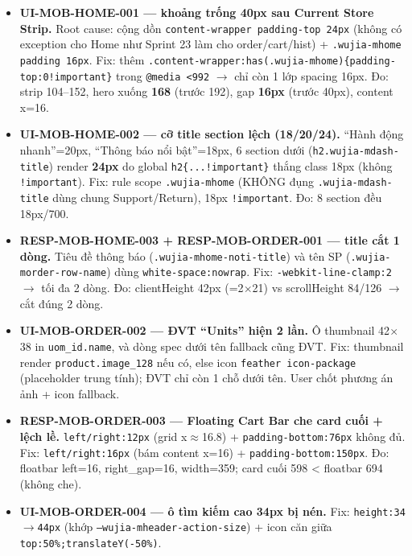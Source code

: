 \begin{itemize}
  \item \textbf{UI-MOB-HOME-001 --- khoảng trống 40px sau Current Store Strip.} Root cause: cộng dồn
    \texttt{content-wrapper padding-top 24px} (không có exception cho Home như Sprint 23 làm cho
    order/cart/hist) + \texttt{.wujia-mhome padding 16px}. Fix: thêm
    \texttt{.content-wrapper:has(.wujia-mhome)\{padding-top:0!important\}} trong \texttt{@media <992}
    $\to$ chỉ còn 1 lớp spacing 16px. Đo: strip 104--152, hero xuống \textbf{168} (trước 192),
    gap \textbf{16px} (trước 40px), content x=16.
  \item \textbf{UI-MOB-HOME-002 --- cỡ title section lệch (18/20/24).} ``Hành động nhanh''=20px,
    ``Thông báo nổi bật''=18px, 6 section dưới (\texttt{h2.wujia-mdash-title}) render \textbf{24px} do
    global \texttt{h2\{...!important\}} thắng class 18px (không \texttt{!important}). Fix: rule scope
    \texttt{.wujia-mhome} (KHÔNG đụng \texttt{.wujia-mdash-title} dùng chung Support/Return), 18px
    \texttt{!important}. Đo: 8 section đều 18px/700.
  \item \textbf{RESP-MOB-HOME-003 + RESP-MOB-ORDER-001 --- title cắt 1 dòng.} Tiêu đề thông báo
    (\texttt{.wujia-mhome-noti-title}) và tên SP (\texttt{.wujia-morder-row-name}) dùng
    \texttt{white-space:nowrap}. Fix: \texttt{-webkit-line-clamp:2} $\to$ tối đa 2 dòng. Đo:
    clientHeight 42px (=2$\times$21) vs scrollHeight 84/126 $\to$ cắt đúng 2 dòng.
  \item \textbf{UI-MOB-ORDER-002 --- ĐVT ``Units'' hiện 2 lần.} Ô thumbnail 42$\times$38 in
    \texttt{uom\_id.name}, và dòng spec dưới tên fallback cũng ĐVT. Fix: thumbnail render
    \texttt{product.image\_128} nếu có, else icon \texttt{feather icon-package} (placeholder trung tính);
    ĐVT chỉ còn 1 chỗ dưới tên. User chốt phương án ảnh + icon fallback.
  \item \textbf{RESP-MOB-ORDER-003 --- Floating Cart Bar che card cuối + lệch lề.} \texttt{left/right:12px}
    (grid x$\approx$16.8) + \texttt{padding-bottom:76px} không đủ. Fix: \texttt{left/right:16px} (bám
    content x=16) + \texttt{padding-bottom:150px}. Đo: floatbar left=16, right\_gap=16, width=359;
    card cuối 598 < floatbar 694 (không che).
  \item \textbf{UI-MOB-ORDER-004 --- ô tìm kiếm cao 34px bị nén.} Fix: \texttt{height:34$\to$44px}
    (khớp \texttt{--wujia-mheader-action-size}) + icon căn giữa \texttt{top:50\%;translateY(-50\%)}.
\end{itemize}

